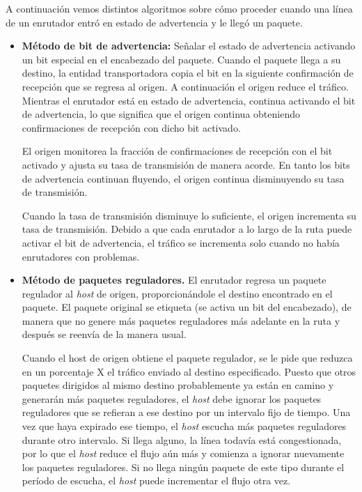 	\par A continuación vemos distintos algoritmos sobre cómo proceder cuando una línea de un enrutador entró en estado de advertencia y le llegó un paquete.

		\begin{itemize}
			\item \textbf{Método de bit de advertencia:} Señalar el estado de advertencia
activando un bit especial en el encabezado del paquete. Cuando el paquete llega a su destino, la entidad transportadora copia el bit en la siguiente confirmación de recepción que se regresa al origen. A continuación el origen reduce el tráfico. Mientras el enrutador está en estado de advertencia, continua activando el bit de advertencia, lo que significa que el origen continua obteniendo confirmaciones de recepción con dicho bit activado.

			\par El origen monitorea la fracción de confirmaciones de recepción con el bit activado y ajusta su tasa de transmisión de manera acorde. En tanto los bits de advertencia continuan fluyendo, el origen continua disminuyendo su tasa de transmisión.

			\par Cuando la tasa de transmisión disminuye lo suficiente, el origen incrementa su tasa de transmisión. Debido a que cada enrutador a lo largo de la ruta puede activar el bit de advertencia, el tráfico se incrementa solo cuando no había enrutadores con problemas.

			\item \textbf{Método de paquetes reguladores.} El enrutador regresa un paquete regulador al \textit{host} de origen, proporcionándole el destino encontrado en el paquete. El paquete original se etiqueta (se activa un bit del encabezado), de manera que no genere más paquetes reguladores más adelante en la ruta y después se reenvía de la manera usual.
	
			\par Cuando el host de origen obtiene el paquete regulador, se le pide que reduzca en un porcentaje X el tráfico enviado al destino especificado. Puesto que otros paquetes dirigidos al mismo destino probablemente ya están en camino y generarán más paquetes reguladores, el \textit{host} debe ignorar los paquetes reguladores que se refieran a ese destino por un intervalo fijo de tiempo. Una vez que haya expirado ese tiempo, el \textit{host} escucha más paquetes reguladores durante otro intervalo. Si llega alguno, la línea todavía está congestionada, por lo que el \textit{host} reduce el flujo aún más y comienza a ignorar nuevamente los paquetes reguladores. Si no llega ningún paquete de este tipo durante el período de escucha, el \textit{host} puede incrementar el flujo otra vez.
 

\end{itemize}
